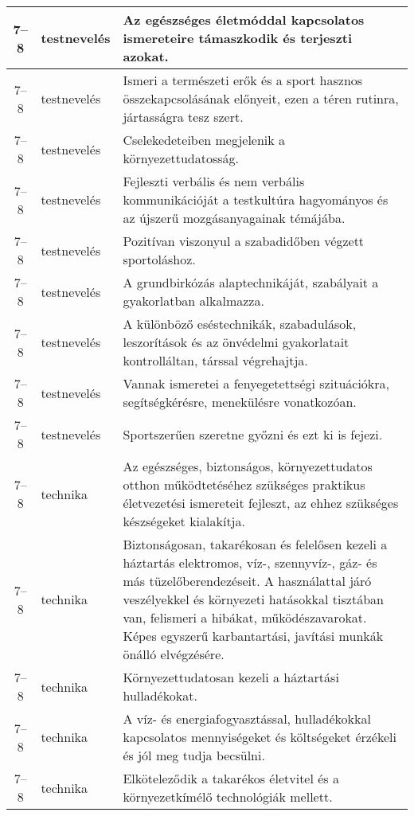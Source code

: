 \begin{small}
\begin{longtable}{c | p{2cm} |  p{11cm} }
              7--8 & testnevelés & Az egészséges életmóddal kapcsolatos ismereteire támaszkodik és terjeszti azokat. \\ \hline
              7--8 & testnevelés & Ismeri a természeti erők és a sport hasznos összekapcsolásának előnyeit, ezen a téren rutinra, jártasságra tesz szert. \\ \hline
              7--8 & testnevelés & Cselekedeteiben megjelenik a környezettudatosság. \\ \hline
              7--8 & testnevelés & Fejleszti verbális és nem verbális kommunikációját a testkultúra hagyományos és az újszerű mozgásanyagainak témájába. \\ \hline
              7--8 & testnevelés & Pozitívan viszonyul a szabadidőben végzett sportoláshoz. \\ \hline
              7--8 & testnevelés & A grundbirkózás alaptechnikáját, szabályait a gyakorlatban alkalmazza. \\ \hline
              7--8 & testnevelés & A különböző eséstechnikák, szabadulások, leszorítások és az önvédelmi gyakorlatait kontrolláltan, társsal végrehajtja. \\ \hline
              7--8 & testnevelés & Vannak ismeretei a fenyegetettségi szituációkra, segítségkérésre, menekülésre vonatkozóan. \\ \hline
              7--8 & testnevelés & Sportszerűen szeretne győzni és ezt ki is fejezi. \\ \hline
              7--8 & technika & Az egészséges, biztonságos, környezettudatos otthon működtetéséhez szükséges praktikus életvezetési ismereteit fejleszt, az ehhez szükséges készségeket kialakítja. \\ \hline
              7--8 & technika & Biztonságosan, takarékosan és felelősen kezeli a háztartás elektromos, víz-, szennyvíz-, gáz- és más tüzelőberendezéseit. A használattal járó veszélyekkel és környezeti hatásokkal tisztában van, felismeri a hibákat, működészavarokat. Képes egyszerű karbantartási, javítási munkák önálló elvégzésére. \\ \hline
              7--8 & technika & Környezettudatosan kezeli a háztartási hulladékokat. \\ \hline
              7--8 & technika & A víz- és energiafogyasztással, hulladékokkal kapcsolatos mennyiségeket és költségeket érzékeli és jól meg tudja becsülni. \\ \hline
              7--8 & technika & Elköteleződik a takarékos életvitel és a környezetkímélő technológiák mellett. \\ \hline

\end{longtable}
\end{small}
